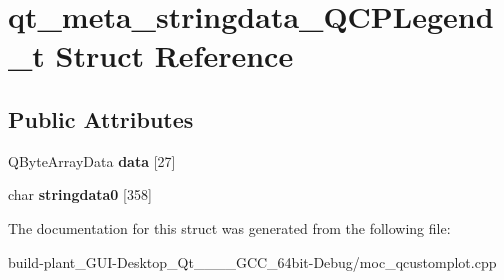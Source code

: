 \hypertarget{structqt__meta__stringdata__QCPLegend__t}{}\section{qt\+\_\+meta\+\_\+stringdata\+\_\+\+Q\+C\+P\+Legend\+\_\+t Struct Reference}
\label{structqt__meta__stringdata__QCPLegend__t}
\subsection*{Public Attributes}
\begin{DoxyCompactItemize}
\item 
\mbox{\label{structqt__meta__stringdata__QCPLegend__t_ad8e758839b2e9818ac5f23a303aa99e7}} 
Q\+Byte\+Array\+Data {\bfseries data} \mbox{[}27\mbox{]}
\item 
\mbox{\label{structqt__meta__stringdata__QCPLegend__t_ad3fb75c2831542ab8fdf3b1e50696a64}} 
char {\bfseries stringdata0} \mbox{[}358\mbox{]}
\end{DoxyCompactItemize}


The documentation for this struct was generated from the following file\+:\begin{DoxyCompactItemize}
\item 
build-\/plant\+\_\+\+G\+U\+I-\/\+Desktop\+\_\+\+Qt\+\_\+\_\+\_\+\_\+\+G\+C\+C\+\_\+64bit-\/\+Debug/moc\+\_\+qcustomplot.\+cpp\end{DoxyCompactItemize}
